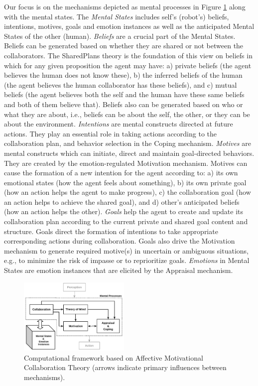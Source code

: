 \documentclass[letterpaper]{article}
\begin{document}
Our focus is on the mechanisms depicted as mental processes in Figure
\ref{fig:cpm} along with the mental states. The \textit{Mental States} includes
self's (robot's) beliefs, intentions, motives, goals and emotion instances as
well as the anticipated Mental States of the other (human). \textit{Beliefs} are
a crucial part of the Mental States. Beliefs can be generated based on whether
they are shared or not between the collaborators. The SharedPlans
\cite{grosz:plans-discourse} theory is the foundation of this view on beliefs in
which for any given proposition the agent may have: a) private beliefs (the
agent believes the human does not know these), b) the inferred beliefs of the
human (the agent believes the human collaborator has these beliefs), and c)
mutual beliefs (the agent believes both the self and the human have these same
beliefs and both of them believe that). Beliefs also can be generated based on
who or what they are about, i.e., beliefs can be about the self, the other, or
they can be about the environment. \textit{Intentions} are mental constructs
directed at future actions. They play an essential role in taking actions
according to the collaboration plan, and behavior selection in the Coping
mechanism. \textit{Motives} are mental constructs which can initiate, direct and
maintain goal-directed behaviors. They are created by the emotion-regulated
Motivation mechanism. Motives can cause the formation of a new intention for the
agent according to: a) its own emotional states (how the agent feels about
something), b) its own private goal (how an action helps the agent to make
progress), c) the collaboration goal (how an action helps to achieve the shared
goal), and d) other's anticipated beliefs (how an action helps the other).
\textit{Goals} help the agent to create and update its collaboration plan
according to the current private and shared goal content and structure. Goals
direct the formation of intentions to take appropriate corresponding actions
during collaboration. Goals also drive the Motivation mechanism to generate
required motive(s) in uncertain or ambiguous situations, e.g., to minimize the
risk of impasse or to reprioritize goals. \textit{Emotions} in Mental States are
emotion instances that are elicited by the Appraisal mechanism.

\begin{figure}[tbh]
  \centering
  \includegraphics[width=0.474\textwidth]{figure/theory-general-croped.pdf}
  \caption{Computational framework based on Affective Motivational Collaboration
  Theory (arrows indicate primary influences between mechanisms).}
  \label{fig:cpm}
\end{figure}
\end{document}
